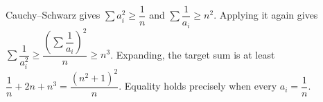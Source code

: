 Cauchy--Schwarz gives $\sum a_i^2\ge\dfrac{1}{n}$ and $\sum\dfrac{1}{a_i}\ge n^2$. Applying it again gives $\sum\dfrac{1}{a_i^2}\ge\dfrac{(\sum\dfrac{1}{a_i})^2}{n}\ge n^3$. Expanding, the target sum is at least $\dfrac{1}{n}+2n+n^3=\dfrac{(n^2+1)^2}{n}$. Equality holds precisely when every $a_i=\dfrac{1}{n}$.
